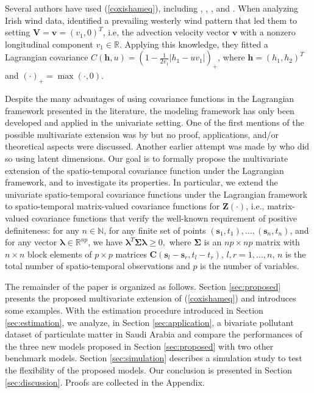 \documentclass[12pt]{article}
\newcommand{\0}{\mathbf{0}}
\begin{document}
Several authors have used (\ref{coxishameq}), including \citet{gneiting2006geostatistical}, \citet{lonij2013intra}, \citet{inoue2012spatio}, and \citet{shinozaki2016areal}. When analyzing Irish wind data, \citet{gneiting2006geostatistical} identified a prevailing westerly wind pattern that led them to setting $\mathbf{V}=\mathbf{v}=(v_1,0)^T$, i.e, the advection velocity vector $\mathbf{v}$ with a nonzero longitudinal component $v_1 \in \mathbb{R}$. Applying this knowledge, they fitted a Lagrangian covariance
$C(\mathbf{h},u)=(1-\frac{1}{2v_1}|h_1-uv_1|)_+$,
where $\mathbf{h}=(h_1,h_2)^T$ and $(\cdot)_+=\max(\cdot,0)$.

Despite the many advantages of using covariance functions in the Lagrangian framework presented in the literature, the modeling framework has only been developed and applied in the univariate setting. One of the first mentions of the possible multivariate extension was by \citet{christakos2017spatiotemporal} but no proof, applications, and/or theoretical aspects were discussed. Another earlier attempt was made by \citet{apanasovich2010cross} who did so using latent dimensions. Our goal is to formally propose the multivariate extension of the spatio-temporal covariance function under the Lagrangian framework, and to investigate its properties. In particular, we extend the univariate spatio-temporal covariance functions under the Lagrangian framework to spatio-temporal matrix-valued covariance functions for $\mathbf{Z(\cdot)}$, i.e., matrix-valued covariance functions that verify the well-known requirement of positive definiteness: for any $n \in \mathbb{N}$, for any finite set of points $(\mathbf{s}_1,t_1),\ldots,(\mathbf{s}_n,t_n)$, and for any vector $\boldsymbol{\lambda} \in \mathbb{R}^{np}$, we have $\boldsymbol{\lambda}^T\boldsymbol{\Sigma}\boldsymbol{\lambda}\geq 0, $ where $\boldsymbol{\Sigma}$ is an $n p\times n p$ matrix with $n\times n$ block elements of $p\times p$ matrices $\mathbf{C}(\mathbf{s}_{l}-\mathbf{s}_{r},t_{l}-t_{r})$, $l,r=1,\ldots,n$, $n$ is the total number of spatio-temporal observations and $p$ is the number of variables.

The remainder of the paper is organized as follows. Section \ref{sec:proposed} presents the proposed multivariate extension of (\ref{coxishameq}) and introduces some examples. With the estimation procedure introduced in Section \ref{sec:estimation}, we analyze, in Section \ref{sec:application}, a bivariate pollutant dataset of particulate matter in Saudi Arabia and compare the performances of the three new models proposed in Section \ref{sec:proposed} with two other benchmark models. Section \ref{sec:simulation} describes a simulation study to test the flexibility of the proposed models. Our conclusion is presented in Section \ref{sec:discussion}. Proofs are collected in the Appendix. 
\end{document}
